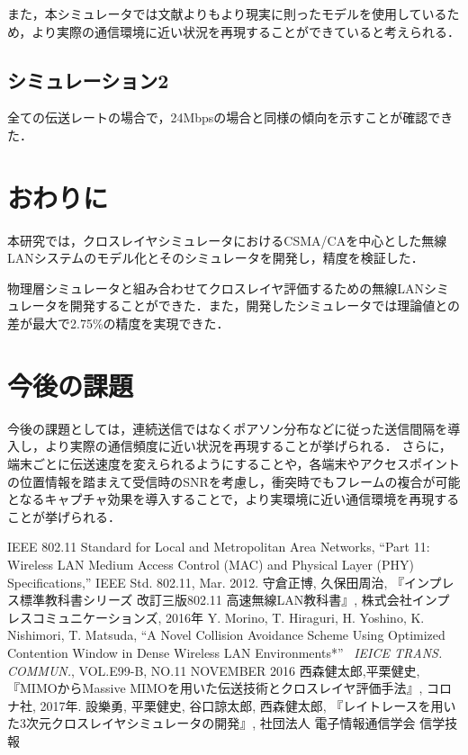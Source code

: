 \documentclass[a4paper,10pt]{ltjsarticle}
\begin{document}
また，本シミュレータでは文献よりもより現実に則ったモデルを使用しているため，より実際の通信環境に近い状況を再現することができていると考えられる．

\subsection{シミュレーション2}
全ての伝送レートの場合で，24Mbpsの場合と同様の傾向を示すことが確認できた．


\clearpage
\section{おわりに}

本研究では，クロスレイヤシミュレータにおけるCSMA/CAを中心とした無線LANシステムのモデル化とそのシミュレータを開発し，精度を検証した．

物理層シミュレータと組み合わせてクロスレイヤ評価するための無線LANシミュレータを開発することができた．また，開発したシミュレータでは理論値との差が最大で2.75\%の精度を実現できた．

\clearpage
\section{今後の課題}

今後の課題としては，連続送信ではなくポアソン分布などに従った送信間隔を導入し，より実際の通信頻度に近い状況を再現することが挙げられる．
さらに，端末ごとに伝送速度を変えられるようにすることや，各端末やアクセスポイントの位置情報を踏まえて受信時のSNRを考慮し，衝突時でもフレームの複合が可能となるキャプチャ効果を導入することで，より実環境に近い通信環境を再現することが挙げられる．


\clearpage
{}
\begin{thebibliography}{99}
  
  IEEE 802.11 Standard for Local and Metropolitan Area
  Networks, “Part 11: Wireless LAN Medium Access Control (MAC) and Physical Layer (PHY) Speciﬁcations,”  IEEE Std. 802.11, Mar. 2012.
守倉正博, 久保田周治, 『インプレス標準教科書シリーズ 改訂三版802.11 高速無線LAN教科書』, 株式会社インプレスコミュニケーションズ, 2016年
Y. Morino, T. Hiraguri, H. Yoshino, K. Nishimori, T. Matsuda, ``A Novel Collision Avoidance Scheme Using Optimized Contention Window in Dense Wireless LAN Environments*'' \, \textit{IEICE TRANS. COMMUN.}, VOL.E99-B, NO.11 NOVEMBER 2016
西森健太郎,平栗健史,『MIMOからMassive MIMOを用いた伝送技術とクロスレイヤ評価手法』, コロナ社, 2017年.
設樂勇, 平栗健史, 谷口諒太郎, 西森健太郎, 『レイトレースを用いた3次元クロスレイヤシミュレータの開発』, 社団法人 電子情報通信学会 信学技報
\end{thebibliography}
\end{document}
